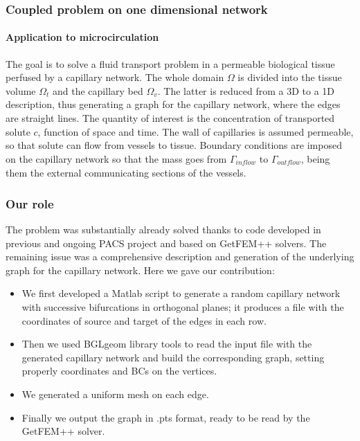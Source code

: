 \documentclass[11pt]{beamer}
\begin{document}
		\begin{frame}
		\frametitle{Coupled problem on one dimensional network}
		\framesubtitle{Application to microcirculation}
		The goal is to solve a fluid transport problem in a permeable biological tissue perfused by a capillary network. The whole domain $\Omega$ is divided into the tissue volume $\Omega_{t}$ and the capillary bed $\Omega_{v}$. The latter is reduced from a 3D to a 1D description, thus generating a graph for the capillary network, where the edges are straight lines.
		\newline\newline
		The quantity of interest is the concentration of transported solute $c$, function of space and time. The wall of capillaries is assumed permeable, so that solute can flow from vessels to tissue.
		\newline\newline
		Boundary conditions are imposed on the capillary network so that the mass goes from $\Gamma_{\textit{inflow}}$ to $\Gamma_{\textit{outflow}}$, being them the external communicating sections of the vessels.
	\end{frame}
	
	\begin{frame}
		\frametitle{Our role}
		The problem was substantially already solved thanks to code developed in previous and ongoing PACS project and based on GetFEM++ solvers. The remaining issue was a comprehensive description and generation of the underlying graph for the capillary network. Here we gave our contribution:
		\begin{itemize}
			\item We first developed a Matlab script to generate a random capillary network with successive bifurcations in orthogonal planes; it produces a file with the coordinates of source and target of the edges in each row.
			\item Then we used BGLgeom library tools to read the input file with the generated capillary network and build the corresponding graph, setting properly coordinates and BCs on the vertices.
			\item We generated a uniform mesh on each edge.
			\item Finally we output the graph in .pts format, ready to be read by the GetFEM++ solver.
		\end{itemize}	
	\end{frame}
	
\end{document}
